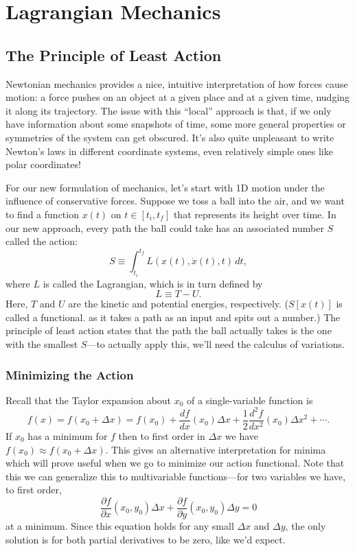 \documentclass[../p111main.tex]{subfiles}
\begin{document}
\chapter{Lagrangian Mechanics}
\section{The Principle of Least Action}
Newtonian mechanics provides a nice, intuitive interpretation of how forces cause motion: a force pushes on an object at a given place and at a given time, nudging it along its trajectory.
The issue with this ``local'' approach is that, if we only have information about some snapshots of time, some more general properties or symmetries of the system can get obscured.
It's also quite unpleasant to write Newton's laws in different coordinate systems, even relatively simple ones like polar coordinates!

For our new formulation of mechanics, let's start with 1D motion under the influence of conservative forces.
Suppose we toss a ball into the air, and we want to find a function $x(t)$ on $t \in [t_i, t_f]$ that represents its height over time.
In our new approach, every path the ball could take has an associated number $S$ called the action:
\[ S \equiv \int_{t_i}^{t_f} L(x(t), \dot x(t), t) \,dt, \]
where $L$ is called the Lagrangian, which is in turn defined by
\[ L \equiv T - U. \]
Here, $T$ and $U$ are the kinetic and potential energies, respectively.
($S[x(t)]$ is called a functional. as it takes a path as an input and spits out a number.)
The principle of least action states that the path the ball actually takes is the one with the smallest $S$---to actually apply this, we'll need the calculus of variations.

\subsection*{Minimizing the Action}
Recall that the Taylor expansion about $x_0$ of a single-variable function is
\[ f(x) = f(x_0 + \Delta x) = f(x_0) + \frac{df}{dx}(x_0) \Delta x + \frac{1}{2} \frac{d^2f}{dx^2} (x_0) \Delta x^2 + \cdots. \]
If $x_0$ has a minimum for $f$ then to first order in $\Delta x$ we have $f(x_0) \approx f(x_0 + \Delta x)$.
This gives an alternative interpretation for minima which will prove useful when we go to minimize our action functional.
Note that this we can generalize this to multivariable functions---for two variables we have, to first order,
\[ \frac{\partial f}{\partial x} (x_0, y_0) \Delta x + \frac{\partial f}{\partial y} (x_0, y_0) \Delta y = 0 \]
at a minimum.
Since this equation holds for any small $\Delta x$ and $\Delta y$, the only solution is for both partial derivatives to be zero, like we'd expect.
\end{document}
